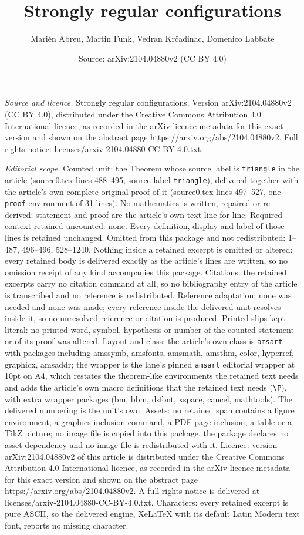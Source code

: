 \documentclass[10pt,a4paper]{amsart}
\title[Strongly regular configurations]{Strongly regular configurations}
\author{Mari\'en Abreu, Martin Funk, Vedran Kr\v{c}adinac, Domenico Labbate}
\date{Source: arXiv:2104.04880v2 (CC BY 4.0)}
\begin{document}
\maketitle

\noindent\emph{Source and licence.} Strongly regular configurations. Version arXiv:2104.04880v2 (CC BY 4.0), distributed under the Creative Commons Attribution 4.0 International licence, as recorded in the arXiv licence metadata for this exact version and shown on the abstract page https://arxiv.org/abs/2104.04880v2. Full rights notice: licenses/arxiv-2104.04880-CC-BY-4.0.txt.\par\smallskip

\noindent\textit{Editorial scope.} Counted unit: the Theorem whose source label is \texttt{triangle} in the article (source0.tex lines 488--495, source label \texttt{triangle}), delivered together with the article's own complete original proof of it (source0.tex lines 497--527, one \texttt{proof} environment of 31 lines). No mathematics is written, repaired or re-derived: statement and proof are the article's own text line for line. Required context retained uncounted: none. Every definition, display and label of those lines is retained unchanged. Omitted from this package and not redistributed: 1--487, 496--496, 528--1240. Nothing inside a retained excerpt is omitted or altered: every retained body is delivered exactly as the article's lines are written, so no omission receipt of any kind accompanies this package. Citations: the retained excerpts carry no citation command at all, so no bibliography entry of the article is transcribed and no reference is redistributed. Reference adaptation: none was needed and none was made; every reference inside the delivered unit resolves inside it, so no unresolved reference or citation is produced. Printed slips kept literal: no printed word, symbol, hypothesis or number of the counted statement or of its proof was altered. Layout and class: the article's own class is \texttt{amsart} with packages including amssymb, amsfonts, amsmath, amsthm, color, hyperref, graphicx, amsaddr; the wrapper is the lane's pinned \texttt{amsart} editorial wrapper at 10pt on A4, which restates the theorem-like environments the retained text needs and adds the article's own macro definitions that the retained text needs (\texttt{\textbackslash P}), with extra wrapper packages (bm, bbm, dsfont, xspace, cancel, mathtools). The delivered numbering is the unit's own. Assets: no retained span contains a figure environment, a graphics-inclusion command, a PDF-page inclusion, a table or a TikZ picture; no image file is copied into this package, the package declares no asset dependency and no image file is redistributed with it. Licence: version arXiv:2104.04880v2 of this article is distributed under the Creative Commons Attribution 4.0 International licence, as recorded in the arXiv licence metadata for this exact version and shown on the abstract page https://arxiv.org/abs/2104.04880v2. A full rights notice is delivered at licenses/arxiv-2104.04880-CC-BY-4.0.txt. Characters: every retained excerpt is pure ASCII, so the delivered engine, XeLaTeX with its default Latin Modern text font, reports no missing character.
\end{document}
